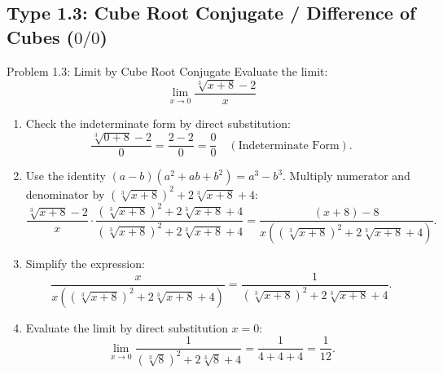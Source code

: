\documentclass[11pt,a4paper]{article}
\begin{document}
\subsection{Type 1.3: Cube Root Conjugate / Difference of Cubes ($0/0$)}
\begin{problembox}{Problem 1.3: Limit by Cube Root Conjugate}
Evaluate the limit:
\[
\lim_{x \to 0} \frac{\sqrt[3]{x + 8} - 2}{x}
\]
\end{problembox}
\begin{solutionbox}
\begin{enumerate}
	\item [Step 1.] Check the indeterminate form by direct substitution:
	\begin{equation*}
		\frac{\sqrt[3]{0 + 8} - 2}{0} = \frac{2 - 2}{0} = \frac{0}{0} \quad (\text{Indeterminate Form}).
	\end{equation*}
	
	\item [Step 2.] Use the identity $(a - b)(a^2 + ab + b^2) = a^3 - b^3$. Multiply numerator and denominator by $(\sqrt[3]{x + 8})^2 + 2\sqrt[3]{x + 8} + 4$:
	\begin{equation*}
		\frac{\sqrt[3]{x + 8} - 2}{x} \cdot \frac{(\sqrt[3]{x + 8})^2 + 2\sqrt[3]{x + 8} + 4}{(\sqrt[3]{x + 8})^2 + 2\sqrt[3]{x + 8} + 4} = \frac{(x + 8) - 8}{x\left((\sqrt[3]{x + 8})^2 + 2\sqrt[3]{x + 8} + 4\right)}.
	\end{equation*}

	\item [Step 3.] Simplify the expression:
	\begin{equation*}
		\frac{x}{x\left((\sqrt[3]{x + 8})^2 + 2\sqrt[3]{x + 8} + 4\right)} = \frac{1}{(\sqrt[3]{x + 8})^2 + 2\sqrt[3]{x + 8} + 4}.
	\end{equation*}

	\item [Step 4.] Evaluate the limit by direct substitution $x = 0$:
	\begin{equation*}
		\lim_{x \to 0} \frac{1}{(\sqrt[3]{8})^2 + 2\sqrt[3]{8} + 4} = \frac{1}{4 + 4 + 4} = \frac{1}{12}.
	\end{equation*}
\end{enumerate}
\end{solutionbox}
\end{document}
